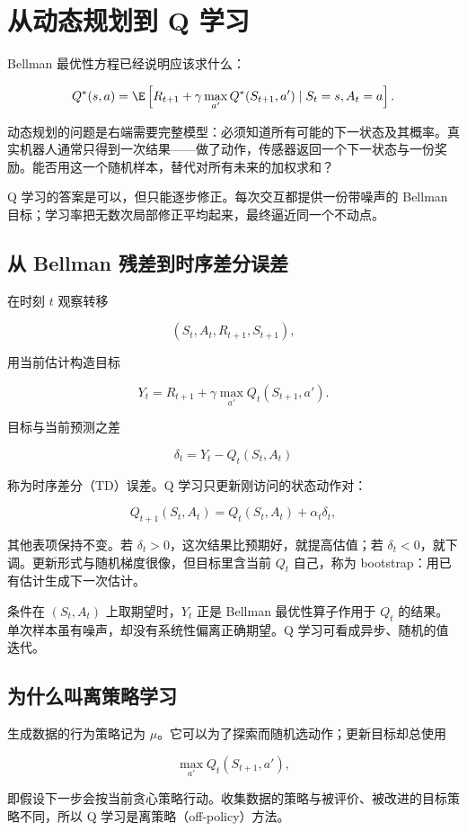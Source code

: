 \section{从动态规划到 Q 学习}

Bellman 最优性方程已经说明应该求什么：

\[
Q^*(s,a)
=
\E\left[
R_{t+1}
+\gamma\max_{a'}Q^*(S_{t+1},a')
\mid S_t=s,A_t=a
\right].
\]

动态规划的问题是右端需要完整模型：必须知道所有可能的下一状态及其概率。真实机器人通常只得到一次结果——做了动作，传感器返回一个下一状态与一份奖励。能否用这一个随机样本，替代对所有未来的加权求和？

Q 学习的答案是可以，但只能逐步修正。每次交互都提供一份带噪声的 Bellman 目标；学习率把无数次局部修正平均起来，最终逼近同一个不动点。

\subsection{从 Bellman 残差到时序差分误差}

在时刻 \(t\) 观察转移

\[
(S_t,A_t,R_{t+1},S_{t+1}),
\]

用当前估计构造目标

\[
Y_t
=
R_{t+1}
+\gamma\max_{a'}Q_t(S_{t+1},a').
\]

目标与当前预测之差

\[
\delta_t
=Y_t-Q_t(S_t,A_t)
\]

称为时序差分（TD）误差。Q 学习只更新刚访问的状态动作对：

\[
Q_{t+1}(S_t,A_t)
=
Q_t(S_t,A_t)
+\alpha_t\delta_t,
\]

其他表项保持不变。若 \(\delta_t>0\)，这次结果比预期好，就提高估值；若 \(\delta_t<0\)，就下调。更新形式与随机梯度很像，但目标里含当前 \(Q_t\) 自己，称为 bootstrap：用已有估计生成下一次估计。

条件在 \((S_t,A_t)\) 上取期望时，\(Y_t\) 正是 Bellman 最优性算子作用于 \(Q_t\) 的结果。单次样本虽有噪声，却没有系统性偏离正确期望。Q 学习可看成异步、随机的值迭代。

\subsection{为什么叫离策略学习}

生成数据的行为策略记为 \(\mu\)。它可以为了探索而随机选动作；更新目标却总使用

\[
\max_{a'}Q_t(S_{t+1},a'),
\]

即假设下一步会按当前贪心策略行动。收集数据的策略与被评价、被改进的目标策略不同，所以 Q 学习是离策略（off-policy）方法。

